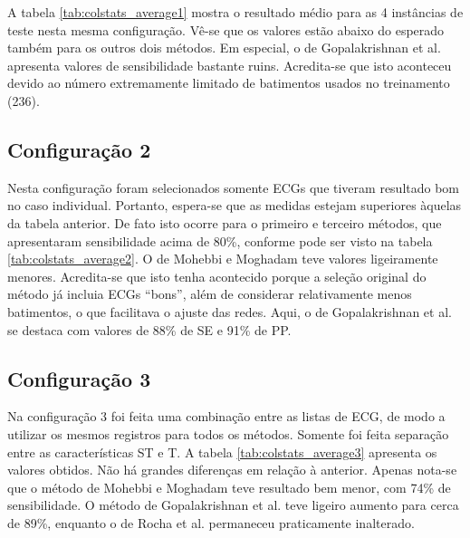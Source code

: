 
A tabela \ref{tab:colstats_average1} mostra o resultado médio para as 4 instâncias de teste nesta mesma configuração. Vê-se que os valores estão abaixo do esperado também para os outros dois métodos. Em especial, o de Gopalakrishnan et al. apresenta valores de sensibilidade bastante ruins. Acredita-se que isto aconteceu devido ao número extremamente limitado de batimentos usados no treinamento (236).


\subsection*{Configuração 2}
Nesta configuração foram selecionados somente ECGs que tiveram resultado bom no caso individual. Portanto, espera-se que as medidas estejam superiores àquelas da tabela anterior. De fato isto ocorre para o primeiro e terceiro métodos, que apresentaram sensibilidade acima de 80\%, conforme pode ser visto na tabela \ref{tab:colstats_average2}. O de Mohebbi e Moghadam teve valores ligeiramente menores. Acredita-se que isto tenha acontecido porque a seleção original do método já incluia ECGs ``bons'', além de considerar relativamente menos batimentos, o que facilitava o ajuste das redes. Aqui, o de Gopalakrishnan et al. se destaca com valores de 88\% de SE e 91\% de PP.


\subsection*{Configuração 3}
Na configuração 3 foi feita uma combinação entre as listas de ECG, de modo a utilizar os mesmos registros para todos os métodos. Somente foi feita separação entre as características ST e T. A tabela \ref{tab:colstats_average3} apresenta os valores obtidos. Não há grandes diferenças em relação à anterior. Apenas nota-se que o método de Mohebbi e Moghadam teve resultado bem menor, com 74\% de sensibilidade. O método de Gopalakrishnan et al. teve ligeiro aumento para cerca de 89\%, enquanto o de Rocha et al. permaneceu praticamente inalterado.

